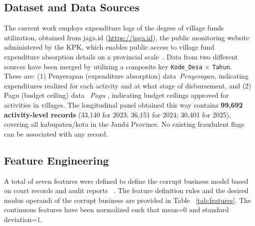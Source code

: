 \documentclass[3p,times,procedia]{elsarticle}
\begin{document}
\subsection{Dataset and Data Sources}

The current work employs expenditure logs of the degree of village funds utilization, obtained from jaga.id (\url{https://jaga.id}), the public monitoring website administered by the KPK, which enables public access to village fund expenditure absorption details on a provincial scale~\cite{ref9}. Data from two different sources have been merged by utilizing a composite key \texttt{Kode\_Desa} × \texttt{Tahun}. These are: (1) Penyerapan (expenditure absorption) data~\textit{Penyerapan}, indicating expenditures realized for each activity and at what stage of disbursement, and (2) Pagu (budget ceiling) data ~\textit{Pagu} , indicating budget ceilings approved for activities in villages. The longitudinal panel obtained this way contains \textbf{99,692 activity-level records} (33,140 for 2023; 36,151 for 2024; 30,401 for 2025), covering all kabupaten/kota in the Jambi Province. No existing fraudulent flags can be associated with any record.

\subsection{Feature Engineering}
\label{sec:features}

A total of seven features were defined to define the corrupt business model based on court records and audit reports ~\cite{ref13, ref14}. The feature definition rules and the desired modus operandi of the corrupt business are provided in Table ~\ref{tab:features}. The continuous features have been normalized such that mean=0 and standard deviation=1.
\end{document}
